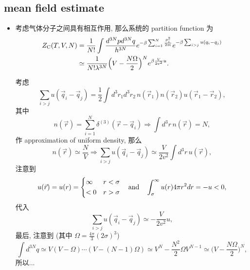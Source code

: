 \subsection{mean field estimate}
\begin{itemize}
	\item 考虑气体分子之间具有相互作用, 那么系统的 partition function 为
	\begin{align}
		Z_\text{C}(T, V, N) &= \frac{1}{N!} \int \frac{d^{3 N} p d^{3 N} q}{h^{3 N}} e^{- \beta \sum_{i = 1}^N \frac{p_i^2}{2 m}} e^{- \beta \sum_{i > j} u(q_i - q_j)} \notag \\
		&\simeq \frac{1}{N! \lambda^{3 N}} \Big( V - \frac{N \Omega}{2} \Big)^N e^{\beta \frac{V}{2 v^2} u}.
	\end{align}
	
	\begin{tcolorbox}[title=calculation:]
		考虑
		\begin{equation}
			\sum_{i > j} u(\vec{q}_i - \vec{q}_j) = \frac{1}{2} \int d^3 r_1 d^3 r_2 \, n(\vec{r}_1) n(\vec{r}_2) u(\vec{r}_1 - \vec{r}_2),
		\end{equation}
		其中
		\begin{equation}
			n(\vec{r}) = \sum_{i = 1}^N \delta^{(3)}(\vec{r} - \vec{q}_i) \Longrightarrow \int d^3 r \, n(\vec{r}) = N,
		\end{equation}
		作 approximation of uniform density, 那么
		\begin{equation}
			n(\vec{r}) \simeq \frac{N}{V} \Longrightarrow \sum_{i > j} u(\vec{q}_i - \vec{q}_j) \simeq \frac{V}{2 v^2} \int d^3 r \, u(\vec{r}),
		\end{equation}
		注意到
		\begin{equation} \label{11.2.5}
			u(\vec{r}) = u(r) = \begin{dcases}
				\infty & r < \sigma \\
				< 0 & r > \sigma
			\end{dcases} \quad \text{and} \quad \int_\sigma^\infty u(r) 4 \pi r^2 dr = - u < 0,
		\end{equation}
		代入
		\begin{equation}
			\sum_{i > j} u(\vec{q}_i - \vec{q}_j) \simeq - \frac{V}{2 v^2} u,
		\end{equation}
		最后, 注意到 (其中 $\Omega = \frac{4 \pi}{3} (2 \sigma)^3$)
		\begin{equation}
			\int d^{3 N} q \simeq V (V - \Omega) \cdots (V - (N - 1) \Omega) \simeq V^N - \frac{N^2}{2} \Omega V^{N - 1} \simeq \Big( V - \frac{N \Omega}{2} \Big)^N,
		\end{equation}
		所以...
	\end{tcolorbox}
	

\end{itemize}
